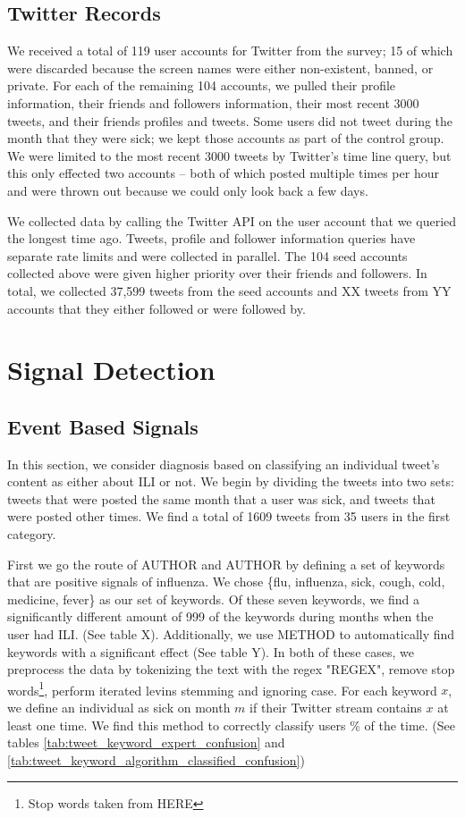 \documentclass{acm_proc_article-sp}
\begin{document}
\subsection{Twitter Records}
We received a total of 119 user accounts for Twitter from the survey; 15 of which were discarded because the screen names were either non-existent, banned, or private. For each of the remaining 104 accounts, we pulled their profile information, their friends and followers information, their most recent 3000 tweets, and their friends profiles and tweets. Some users did not tweet during the month that they were sick; we kept those accounts as part of the control group. We were limited to the most recent 3000 tweets by Twitter's time line query, but this only effected two accounts -- both of which posted multiple times per hour and were thrown out because we could only look back a few days.

We collected data by calling the Twitter API on the user account that we queried the longest time ago. Tweets, profile and follower information queries have separate rate limits and were collected in parallel. The 104 seed accounts collected above were given higher priority over their friends and followers. In total, we collected 37,599 tweets from the seed accounts and XX tweets from YY accounts that they either followed or were followed by.


\section{Signal Detection}
\subsection{Event Based Signals}

In this section, we consider diagnosis based on classifying an individual tweet's content as either about ILI or not. We begin by dividing the tweets into two sets: tweets that were posted the same month that a user was sick, and tweets that were posted other times. We find a total of 1609 tweets from 35 users in the first category.

First we go the route of AUTHOR and AUTHOR by defining a set of keywords that are positive signals of influenza. We chose \{flu, influenza, sick, cough, cold, medicine, fever\} as our set of keywords. Of these seven keywords, we find a significantly different amount of 999 of the keywords during months when the user had ILI. (See table X). Additionally, we use METHOD to automatically find keywords with a significant effect (See table Y). In both of these cases, we preprocess the data by tokenizing the text with the regex "REGEX", remove stop words\footnote{Stop words taken from HERE}, perform iterated levins stemming and ignoring case. For each keyword \(x\), we define an individual as sick on month \(m\) if their Twitter stream contains \(x\) at least one time. We find this method to correctly classify users \% of the time. (See tables \ref{tab:tweet_keyword_expert_confusion} and \ref{tab:tweet_keyword_algorithm_classified_confusion})
\end{document}
